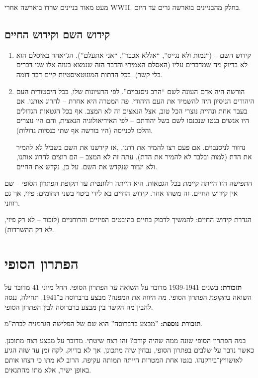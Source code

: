 \documentclass[a4paper]{book}
\begin{document}
	מעט מאוד בניינים שרדו בוארשה אחרי WWII. בחלק מהבניינים בוארשה גרים עד היום. 
	
	\subsection{קידוש השם וקידוש החיים}
	\begin{enumerate}
		\item קידוש השם – (``נמות ולא נגייס'', ``אללא אכבר'', ``אני אתעלם''). הג'יאהד באיסלם הוא לא בדיוק מה שמדברים עליו (האסלם האמיתי והדבר הזה שנמצא בעזה אלו שני דברים בלי קשר). בכל הדתות המונוטאיסטיות קיים דבר דומה. 
		\item הורשה היה אדם העונה לשם ``הרב ניסנבוים''. לפי הרעיונות שלו, בכל היסטורית העם היהודים הניסיון היה להשמיד את העם היהודי. פה המטרה היא אחרת – להרוג אותנו. אם בעבר אחת ונהיית נוצרי הכל טוב, אצל הנאצים זה לא המצב. אף בכל הגטאות הגדולים היו אנשים בגטו שנכנסו לשם בשל יהודתם – לפי האידיאולוגיה הנאצית, והם היו נוצרים והלכו לכנייסה (היו בורשה אף שתי כנסיות גדולות). 
		
		נחזור לניסנבוים. אם פעם רצו להמיר את דתנו, ,אז קידשנו את השם בשביל לא להמיר את הדת (למות ובלבד לא להמיר את הדת). עתה זה לא המצב – הם רוצים להרוג אותנו, ולא יעזור שנקדש את השם. על כן, נקדש את החיים. 
	\end{enumerate}
	התפישה הזו הייתה קיימת בכל הגטאות. היא הייתה רלוונטית עד תקופת הפתרון הסופי – שם אין קידוש החיים. זה משהו אחר. קידוש החיים בא לידי ביטוי בשני תחומים: פיזי, אך גם רוחני. 
	
	
	הגדרת קידוש החיים: להמשיך לדבוק בחיים בהיבטים הפיזיים והרוחניים (לזכור – לא רק פיזי, לא רק ההשרדות). 
	
	\section{הפתרון הסופי}
	
	\textbf{תזכורת: }בשנים 1939-1941 מדובר על השואה \textit{עד} הפתרון הסופי. החל מיוני 41 מדובר על השואה \textit{בתקופת} הפתרון הסופי. מה היווה את המפנה? מבצע ברברוסה ב־1941. תחילה, ננסה להבין מה הקשר בין מבצע ברברוסה לבין הפתרון הסופי. 
	
	\textbf{תזכורת נוספת: }''מבצע ברברוסה'' הוא שם של הפלישה הגרמנית לברה''מ. 
	
	במה הפתרון הסופי שונה ממה שהיה קודם? זהו רצח שיטתי. מדובר על מבצע רצח מתוכנן. כאשר נדבר על שלבים בפתרון הסופי, נבחין שזה מתכונן, אך לא בדיוק. לקח זמן עד שזה הגיע לאושוויץ־בירקנהו. בגטו אחת המטרות הייתה תמותה עקיפה. הרוב לא מתו כי רצחו אותם באופן ישיר, אלא מתו מהתנאים. 
	
\end{document}
